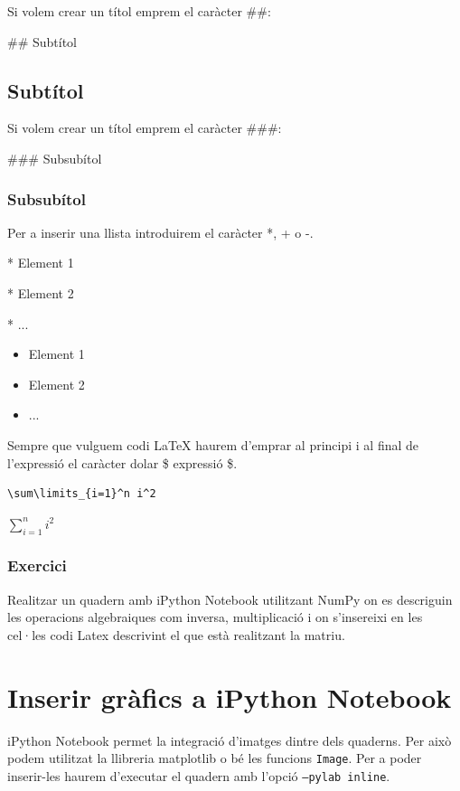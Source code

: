 Si volem crear un títol emprem el caràcter \#\#:

\#\# Subtítol

\subsection*{Subtítol}

Si volem crear un títol emprem el caràcter \#\#\#:

\#\#\# Subsubítol

\subsubsection*{Subsubítol}


Per a inserir una llista introduirem el caràcter *, + o -.

* Element 1

* Element 2

* ...


\begin{itemize}
\item Element 1
\item Element 2
\item ...
\end{itemize}

Sempre que vulguem codi LaTeX haurem d'emprar al principi i al final de l'expressió el caràcter dolar \$ expressió \$.

\begin{verbatim}
\sum\limits_{i=1}^n i^2
\end{verbatim}

$\sum\limits_{i=1}^n i^2$


\subsubsection*{Exercici } 

Realitzar un quadern amb iPython Notebook utilitzant NumPy on es descriguin les operacions algebraiques com inversa, multiplicació i on s'insereixi en les cel·les codi Latex descrivint el que està realitzant la matriu.




\section{Inserir gràfics a iPython Notebook}

iPython Notebook permet la integració d'imatges dintre dels quaderns. Per això podem utilitzat la llibreria matplotlib o bé les funcions {\tt Image}. Per a poder inserir-les haurem d'executar el quadern amb l'opció {\tt --pylab inline}.


